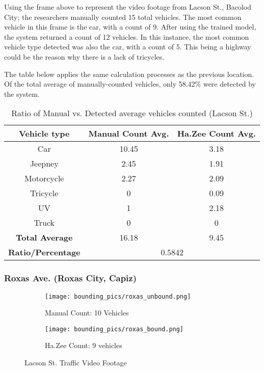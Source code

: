 Using the frame above to represent the video footage from Lacson St., Bacolod City; the researchers manually counted 15 total vehicles. The most common vehicle in this frame is the car, with a count of 9. After using the trained model, the system returned a count of 12 vehicles. In this instance, the most common vehicle type detected was also the car, with a count of 5. This being a highway could be the reason why there is a lack of tricycles.

The table below applies the same calculation processes as the previous location. Of the total average of manually-counted vehicles, only 58.42\% were detected by the system. 



\begin{table}[ht]   %
	\centering
	\caption{Ratio of Manual vs. Detected average vehicles counted  (Lacson St.)} \vspace{0.25em}
	\begin{tabular}{c|c|c} \hline
		\centering \textbf {Vehicle type} & \textbf{Manual Count Avg.} & \textbf{Ha.Zee Count Avg.} \\ \hline
		Car & 10.45 & 3.18   \\ 
		Jeepney & 2.45 & 1.91  	\\ 
		Motorcycle& 2.27  & 2.09  \\ 
		Tricycle   & 0  & 0.09  \\ 
		UV & 1 & 2.18  \\ 
		Truck & 0 & 0 \\ \hline
		
		\textbf{Total Average} & 16.18 & 9.45  \\ \hline
		
		\textbf{Ratio/Percentage} & \multicolumn{2}{c}{0.5842}  \\ \hline
		
	\end{tabular}
	\label{tab:lacson_st}
\end{table}

\subsubsection{Roxas Ave. (Roxas City, Capiz)
}


\begin{figure}[!htbp]
	\begin{subfigure}{.5\textwidth}
		\centering
		\texttt{[image: bounding\_pics/roxas\_unbound.png]}
		\caption{Manual Count: 10 Vehicles}
		
	\end{subfigure}%
	\begin{subfigure}{.5\textwidth}
		\centering
		\texttt{[image: bounding\_pics/roxas\_bound.png]}
		\caption{Ha.Zee Count: 9 vehicles}
	\end{subfigure}
	\caption{Lacson St. Traffic Video Footage}
\end{figure}
\FloatBarrier

